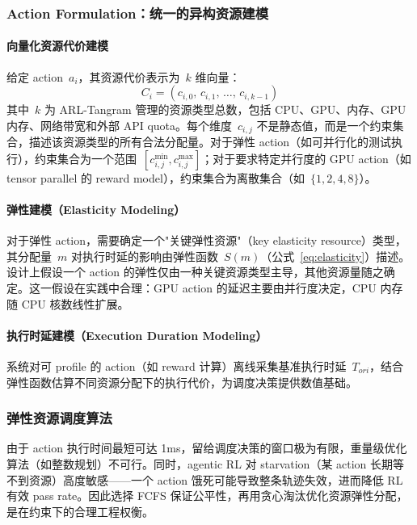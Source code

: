 \documentclass[11pt, a4paper]{article}
\begin{document}
\subsubsection{Action Formulation：统一的异构资源建模}

\paragraph{向量化资源代价建模}
给定 action~$a_i$，其资源代价表示为~$k$ 维向量：
\[
  C_i = (c_{i,0},\, c_{i,1},\, \ldots,\, c_{i,k-1})
\]
其中~$k$ 为 ARL-Tangram 管理的资源类型总数，包括 CPU、GPU、内存、GPU 内存、网络带宽和外部 API quota。每个维度~$c_{i,j}$ 不是静态值，而是一个约束集合，描述该资源类型的所有合法分配量。对于弹性 action（如可并行化的测试执行），约束集合为一个范围~$[c^{\min}_{i,j}, c^{\max}_{i,j}]$；对于要求特定并行度的 GPU action（如 tensor parallel 的 reward model），约束集合为离散集合（如~$\{1, 2, 4, 8\}$）。

\paragraph{弹性建模（Elasticity Modeling）}
对于弹性 action，需要确定一个"关键弹性资源"（key elasticity resource）类型，其分配量~$m$ 对执行时延的影响由弹性函数~$S(m)$（公式~\ref{eq:elasticity}）描述。设计上假设一个 action 的弹性仅由一种关键资源类型主导，其他资源量随之确定。这一假设在实践中合理：GPU action 的延迟主要由并行度决定，CPU 内存随 CPU 核数线性扩展。

\paragraph{执行时延建模（Execution Duration Modeling）}
系统对可 profile 的 action（如 reward 计算）离线采集基准执行时延~$T_{\mathit{ori}}$，结合弹性函数估算不同资源分配下的执行代价，为调度决策提供数值基础。

\subsubsection{弹性资源调度算法}

\begin{keyinsight}
由于 action 执行时间最短可达 1ms，留给调度决策的窗口极为有限，重量级优化算法（如整数规划）不可行。同时，agentic RL 对 starvation（某 action 长期等不到资源）高度敏感——一个 action 饿死可能导致整条轨迹失效，进而降低 RL 有效 pass rate。因此选择 FCFS 保证公平性，再用贪心淘汰优化资源弹性分配，是在约束下的合理工程权衡。
\end{keyinsight}
\end{document}
